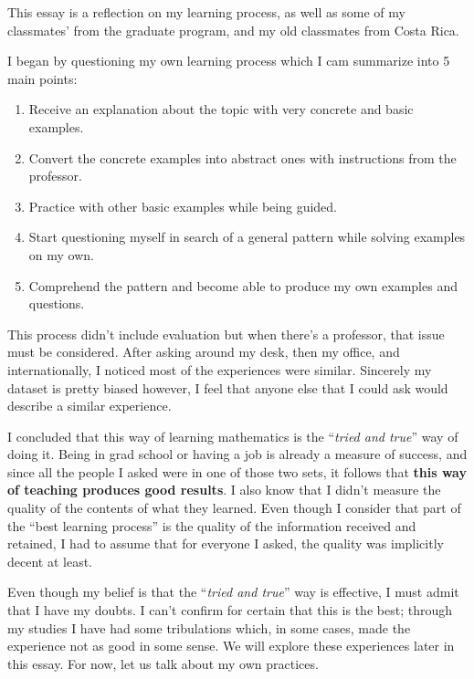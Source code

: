 \documentclass[a4paper,12pt,final]{book}
\begin{document}
 This essay is a reflection on my learning process, as well as some of my classmates' from the graduate program, and my old classmates from Costa Rica.\par 
I began by questioning my own learning process which I cam summarize into 5 main points:
\begin{enumerate}
    \itemsep=-0.4em
    \item Receive an explanation about the topic with very concrete and basic examples. 
    \item Convert the concrete examples into abstract ones with instructions from the professor. 
    \item Practice with other basic examples while being guided.
    \item Start questioning myself in search of a general pattern while solving examples on my own.
    \item Comprehend the pattern and become able to produce my own examples and questions.
\end{enumerate}
This process didn't include evaluation but when there's a professor, that issue must be considered. After asking around my desk, then my office, and internationally, I noticed most of the experiences were similar. Sincerely my dataset is pretty biased however, I feel that anyone else that I could ask would describe a similar experience.\par 
I concluded that this way of learning mathematics is the ``\emph{tried and true}'' way of doing it. Being in grad school or having a job is already a measure of success, and since all the people I asked were in one of those two sets, it follows that \textbf{this way of teaching produces good results}. I also know that I didn't measure the quality of the contents of what they learned. Even though I consider that part of the ``best learning process'' is the quality of the information received and retained, I had to assume that for everyone I asked, the quality was implicitly decent at least.\par 
Even though my belief is that the ``\emph{tried and true}'' way is effective, I must admit that I have my doubts. I can't confirm for certain that this is the best; through my studies I have had some tribulations which, in some cases, made the experience not as good in some sense. We will explore these experiences later in this essay. For now, let us talk about my own practices.\par 
\end{document}
